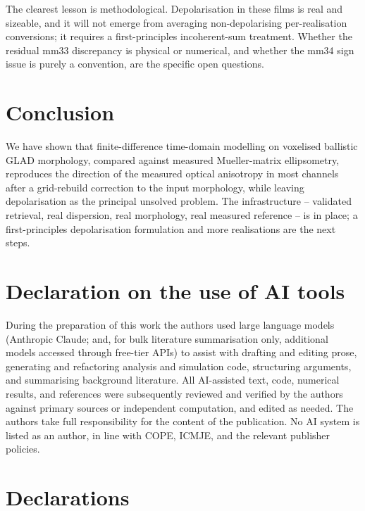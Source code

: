 \documentclass[aip,jcp,amsmath,amssymb,reprint]{revtex4-1}
\begin{document}
The clearest lesson is methodological. Depolarisation in these films is real and
sizeable, and it will not emerge from averaging non-depolarising per-realisation
conversions; it requires a first-principles incoherent-sum treatment. Whether
the residual mm33 discrepancy is physical or numerical, and whether the mm34
sign issue is purely a convention, are the specific open questions.

\section{Conclusion}
\label{sec:conclusion}
We have shown that finite-difference time-domain modelling on voxelised
ballistic GLAD morphology, compared against measured Mueller-matrix
ellipsometry, reproduces the direction of the measured optical anisotropy in
most channels after a grid-rebuild correction to the input morphology, while
leaving depolarisation as the principal unsolved problem. The infrastructure --
validated retrieval, real dispersion, real morphology, real measured reference
-- is in place; a first-principles depolarisation formulation and more
realisations are the next steps.

\section*{Declaration on the use of AI tools}
During the preparation of this work the authors used large language models
(Anthropic Claude; and, for bulk literature summarisation only, additional
models accessed through free-tier APIs) to assist with drafting and editing
prose, generating and refactoring analysis and simulation code, structuring
arguments, and summarising background literature. All AI-assisted text, code,
numerical results, and references were subsequently reviewed and verified by the
authors against primary sources or independent computation, and edited as
needed. The authors take full responsibility for the content of the publication.
No AI system is listed as an author, in line with COPE, ICMJE, and the relevant
publisher policies.

\section*{Declarations}
\end{document}
